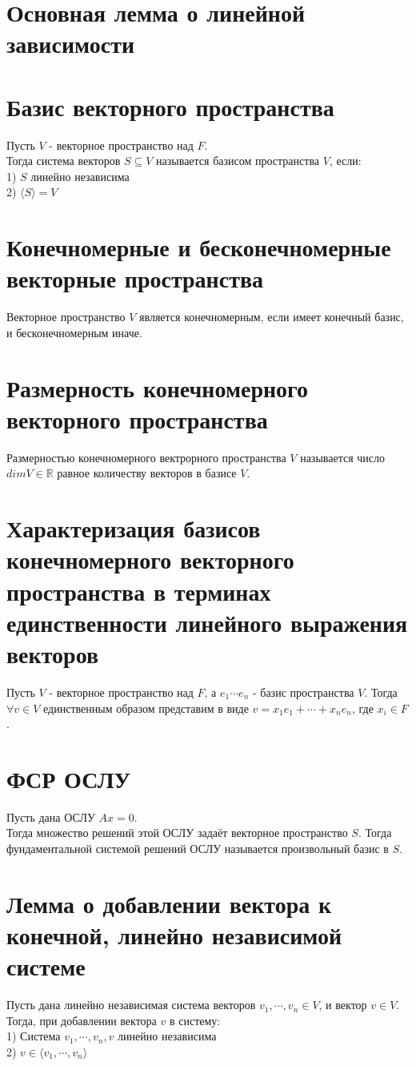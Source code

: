 \documentclass[a4paper,11pt]{report}
\begin{document}
\section{Основная лемма о линейной зависимости}
\section{Базис векторного пространства}
Пусть $V$ - векторное пространство над $F$.\\
Тогда система векторов $S \subseteq V$ называется базисом пространства $V$, если:\\
1) $S$ линейно независима\\
2) $\langle{S}\rangle = V$\\
\section{Конечномерные и бесконечномерные векторные пространства}
Векторное пространство $V$ является конечномерным, если имеет конечный базис, и бесконечномерным иначе.
\section{Размерность конечномерного векторного пространства}
Размерностью конечномерного вектрорного пространства $V$ называется число $dim V \in \mathbb{R}$ равное количеству
векторов в базисе $V$.
\section{Характеризация базисов конечномерного векторного пространства в терминах единственности линейного выражения
векторов}
Пусть $V$ - векторное пространство над $F$, а $e_1 \cdots e_n$ - базис пространства $V$. 
Тогда $\forall v \in V$ единственным образом представим в виде $v = x_1e_1 + \cdots + x_ne_n$, где $x_i \in F$.
\section{ФСР ОСЛУ}
Пусть дана ОСЛУ $Ax = 0$.\\
Тогда множество решений этой ОСЛУ задаёт векторное пространство $S$. 
Тогда фундаментальной системой решений ОСЛУ называется произвольный базис в $S$.
\section{Лемма о добавлении вектора к конечной, линейно независимой системе}
Пусть дана линейно независимая система векторов $v_1, \cdots, v_n \in V$, и вектор $v \in V$.\\
Тогда, при добавлении вектора $v$ в систему:\\
1) Система $v_1, \cdots, v_n, v$ линейно независима\\
2) $v \in \langle v_1, \cdots, v_n \rangle$
\end{document}
